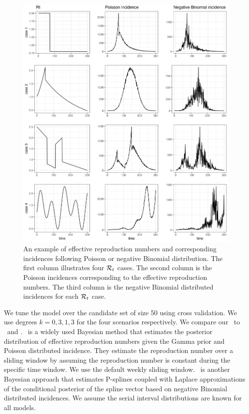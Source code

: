 \begin{figure}[tb]
    \centering
    \includegraphics[width=140mm]{fig/plot_samples.png}
    \caption{An example of effective reproduction numbers and corresponding incidences following Poisson or negative Binomial distribution. The first column illustrates four $\mathcal{R}_t$ cases. The second column is the Poisson incidences corresponding to the effective reproduction numbers. The third column is the negative Binomial distributed incidences for each $\mathcal{R}_t$ case.}
    \label{fig:samples}
\end{figure}

We tune the model over the candidate set of size 50 using cross validation. We use degrees $k=0,3,1,3$ for the four scenarios respectively. 
We compare our \RtEstim\ to \EpiEstim\ and \EpiLPS. \EpiEstim\ is a widely used Bayesian method that estimates the posterior distribution of effective reproduction numbers given the Gamma prior and Poisson distributed incidence. They estimate the reproduction number over a sliding window by assuming the reproduction number is constant during the specific time window. We use the default weekly sliding window. \EpiLPS\ is another Bayesian approach that estimates P-splines coupled with Laplace approximations of the conditional posterior of the spline vector based on negative Binomial distributed incidences. 
%
We assume the serial interval distributions are known for all models. 

